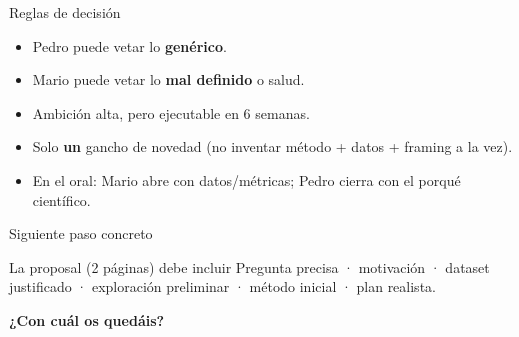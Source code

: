 \documentclass[aspectratio=169,10pt]{beamer}
\begin{document}
\begin{frame}{Reglas de decisión}
  \begin{itemize}
    \item Pedro puede vetar lo \textbf{genérico}.
    \item Mario puede vetar lo \textbf{mal definido} o salud.
    \item Ambición alta, pero ejecutable en 6 semanas.
    \item Solo \textbf{un} gancho de novedad (no inventar método + datos + framing a la vez).
    \item En el oral: Mario abre con datos/métricas; Pedro cierra con el porqué científico.
  \end{itemize}
\end{frame}

\begin{frame}{Siguiente paso concreto}
  \vspace{0.5em}
  \begin{block}{La proposal (2 páginas) debe incluir}
    Pregunta precisa · motivación · dataset justificado · exploración preliminar · método inicial · plan realista.
  \end{block}
  \begin{center}\Large\textbf{¿Con cuál os quedáis?}\end{center}
\end{frame}
\end{document}

